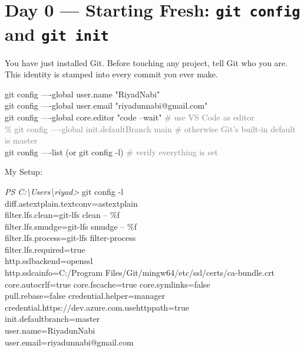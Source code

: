 \documentclass[10pt,a4paper]{article}
\newenvironment{codebox}{%
  \begin{mdframed}[backgroundcolor=codebg, linewidth=0pt,
    innerleftmargin=6pt, innerrightmargin=6pt,
    innertopmargin=4pt, innerbottommargin=4pt]%
  \small\ttfamily
}{%
  \end{mdframed}%
}
\begin{document}
\section{Day 0 --- Starting Fresh: \texttt{git config} and \texttt{git init}}

You have just installed Git. Before touching any project, tell Git who you are.
This identity is stamped into every commit you ever make.

\begin{codebox}
git config ----global user.name "RiyadNabi"\\
git config ----global user.email "riyadunnabi@gmail.com"\\
git config ----global core.editor "code --wait"   \textcolor{gray}{\# use VS Code as editor\\}
\textcolor{gray}{\% git config ----global init.defaultBranch main \# otherwise Git's built-in default is master} \\
git config ----list   (or git config -l)                               \textcolor{gray}{\# verify everything is set}
\end{codebox}

My Setup:
\begin{codebox}
\tiny{\textit{PS C:\textbackslash Users\textbackslash riyad>} git config -l\\
diff.astextplain.textconv=astextplain\\
filter.lfs.clean=git-lfs clean -- \%f\\
filter.lfs.smudge=git-lfs smudge -- \%f\\
filter.lfs.process=git-lfs filter-process\\
filter.lfs.required=true\\
http.sslbackend=openssl\\
http.sslcainfo=C:/Program Files/Git/mingw64/etc/ssl/certs/ca-bundle.crt\\
core.autocrlf=true \quad core.fscache=true \quad core.symlinks=false\\
pull.rebase=false \quad credential.helper=manager\\
credential.https://dev.azure.com.usehttppath=true\\
init.defaultbranch=master\\
user.name=RiyadunNabi \\ user.email=riyadunnabi@gmail.com}
\end{codebox}
\end{document}
